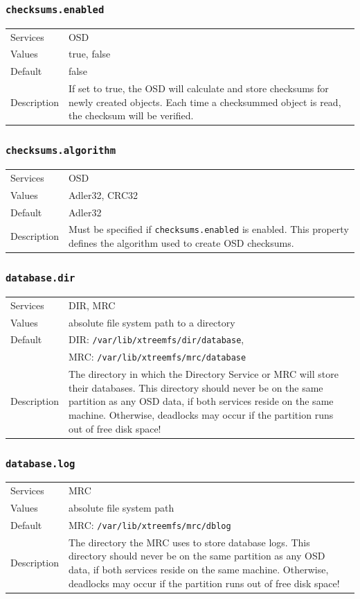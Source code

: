 \documentclass[a4paper,10pt]{book}
\begin{document}
\subsubsection{\texttt{checksums.enabled}}
\begin{tabular}{lp{10cm}}
 Services & OSD\\
 Values   & true, false \\
 Default  & false \\
 Description & If set to true, the OSD will calculate and store checksums for newly created objects. Each time a checksummed object is read, the checksum will be verified.
\end{tabular}

\subsubsection{\texttt{checksums.algorithm}}
\begin{tabular}{lp{10cm}}
 Services & OSD\\
 Values   & Adler32, CRC32 \\
 Default  & Adler32 \\
 Description & Must be specified if \texttt{checksums.enabled} is enabled. This property defines the algorithm used to create OSD checksums.
\end{tabular}

\subsubsection{\texttt{database.dir}}
\begin{tabular}{lp{10cm}}
 Services & DIR, MRC\\
 Values   & absolute file system path to a directory\\
 Default  & DIR: \texttt{/var/lib/xtreemfs/dir/database},\\
 & MRC: \texttt{/var/lib/xtreemfs/mrc/database}\\
 Description & The directory in which the Directory Service or MRC will store their databases. This directory should never be on the same partition as any OSD data, if both services reside on the same machine. Otherwise, deadlocks may occur if the partition runs out of free disk space!
\end{tabular}

\subsubsection{\texttt{database.log}}
\begin{tabular}{lp{10cm}}
 Services & MRC\\
 Values   & absolute file system path\\
 Default  & MRC: \texttt{/var/lib/xtreemfs/mrc/dblog}\\
 Description & The directory the MRC uses to store database logs. This directory should never be on the same partition as any OSD data, if both services reside on the same machine. Otherwise, deadlocks may occur if the partition runs out of free disk space!
\end{tabular}
\end{document}
